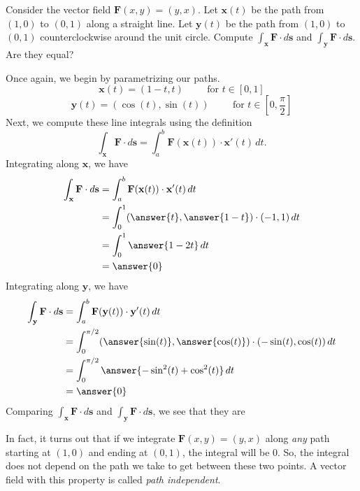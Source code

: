 \documentclass{ximera}
\begin{document}
\begin{example}
Consider the vector field $\textbf{F}(x,y) = (y,x)$. Let $\textbf{x}(t)$ be the path from $(1,0)$ to $(0,1)$ along a straight line. Let $\textbf{y}(t)$ be the path from $(1,0)$ to $(0,1)$ counterclockwise around the unit circle. Compute $\int_\textbf{x} \textbf{F}\cdot d\textbf{s}$ and $\int_\textbf{y} \textbf{F}\cdot d\textbf{s}$. Are they equal?
\begin{explanation}
Once again, we begin by parametrizing our paths.
\[
\textbf{x}(t)= (1-t,t)\hspace{1cm}\textrm{for }t\in[0,1]
\]
\[
\textbf{y}(t)= (\cos(t),\sin(t))\hspace{1cm}\textrm{for }t\in[0,\frac{\pi}{2}]
\]
Next, we compute these line integrals using the definition
\[
\int_\textbf{x} \textbf{F}\cdot d\textbf{s} = \int_a^b\textbf{F}(\textbf{x}(t))\cdot \textbf{x}'(t)\,dt.
\]
Integrating along $\textbf{x}$, we have
\begin{align*}
\int_\textbf{x} \textbf{F}\cdot d\textbf{s} &= \int_a^b\textbf{F}(\textbf{x}(t))\cdot \textbf{x}'(t)\,dt\\
&= \int_{0}^{1}(\answer{t},\answer{1-t})\cdot(-1, 1)\,dt\\
&= \int_{0}^{1}\answer{1-2t}\,dt\\
&= \answer{0}
\end{align*}
Integrating along $\textbf{y}$, we have
\begin{align*}
\int_\textbf{y} \textbf{F}\cdot d\textbf{s} &= \int_a^b\textbf{F}(\textbf{y}(t))\cdot \textbf{y}'(t)\,dt\\
&= \int_{0}^{\pi/2}(\answer{\sin(t)},\answer{\cos(t)})\cdot(-\sin(t), \cos(t))\,dt\\
&= \int_{0}^{\pi/2}\answer{-\sin^2(t)+\cos^2(t)}\,dt\\
&= \answer{0}
\end{align*}
Comparing $\int_\textbf{x} \textbf{F}\cdot d\textbf{s}$ and $\int_\textbf{y} \textbf{F}\cdot d\textbf{s}$, we see that they are
\begin{multipleChoice}
\end{multipleChoice}
\end{explanation}
\end{example}

In fact, it turns out that if we integrate $\textbf{F}(x,y) = (y,x)$ along \emph{any} path starting at $(1,0)$ and ending at $(0,1)$, the integral will be $0$. So, the integral does not depend on the path we take to get between these two points. A vector field with this property is called \emph{path independent}.
\end{document}

